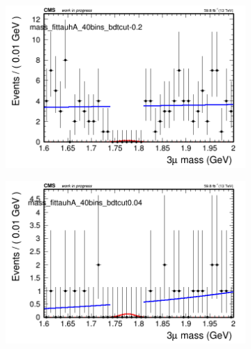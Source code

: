 \begin{figure}[H]
\begin{subfigure}{0.2\textwidth}
        \caption{}
    \end{subfigure}
    \begin{subfigure}{0.2\textwidth}
        \includegraphics[width=\textwidth]{unfixed_exp/plots/tauhA/massfit_tauhA_40bins_bdtcut-0.2.png}
        \caption{}
    \end{subfigure}
    \begin{subfigure}{0.2\textwidth}
        \includegraphics[width=\textwidth]{unfixed_exp/plots/tauhA/massfit_tauhA_40bins_bdtcut0.04.png}
        \caption{}
    \end{subfigure}
    \begin{subfigure}{0.2\textwidth}

\end{subfigure}
\end{figure}
